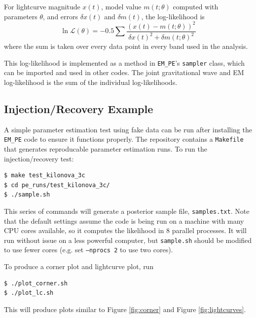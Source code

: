 \documentclass{article}
\begin{document}
For lightcurve magnitude $x(t)$, model value $m(t; \theta)$ computed with parameters $\theta$, and errors $\delta x(t)$ and $\delta m(t)$, the log-likelihood is
\begin{equation}
    \ln \mathcal{L}(\theta) = -0.5 \sum \frac {(x(t) - m(t; \theta))^2} {\delta x(t)^2 + \delta m(t; \theta)^2}
\end{equation}
where the sum is taken over every data point in every band used in the analysis.

This log-likelihood is implemented as a method in \texttt{EM\_PE}'s \texttt{sampler} class, which can be imported and used in other codes.
The joint gravitational wave and EM log-likelihood is the sum of the individual log-likelihoods.

\subsection{Injection/Recovery Example}

A simple parameter estimation test using fake data can be run after installing the \texttt{EM\_PE} code to ensure it functions properly.
The repository contains a \texttt{Makefile} that generates reproducable parameter estimation runs.
To run the injection/recovery test:
\begin{verbatim}
$ make test_kilonova_3c
$ cd pe_runs/test_kilonova_3c/
$ ./sample.sh
\end{verbatim}
This series of commands will generate a posterior sample file, \texttt{samples.txt}.
Note that the default settings assume the code is being run on a machine with many CPU cores available, so it computes the likelihood in 8 parallel processes.
It will run without issue on a less powerful computer, but \texttt{sample.sh} should be modified to use fewer cores (e.g. set \texttt{--nprocs 2} to use two cores).

To produce a corner plot and lightcurve plot, run
\begin{verbatim}
$ ./plot_corner.sh
$ ./plot_lc.sh
\end{verbatim}
This will produce plots similar to Figure \ref{fig:corner} and Figure \ref{fig:lightcurves}.
\end{document}
